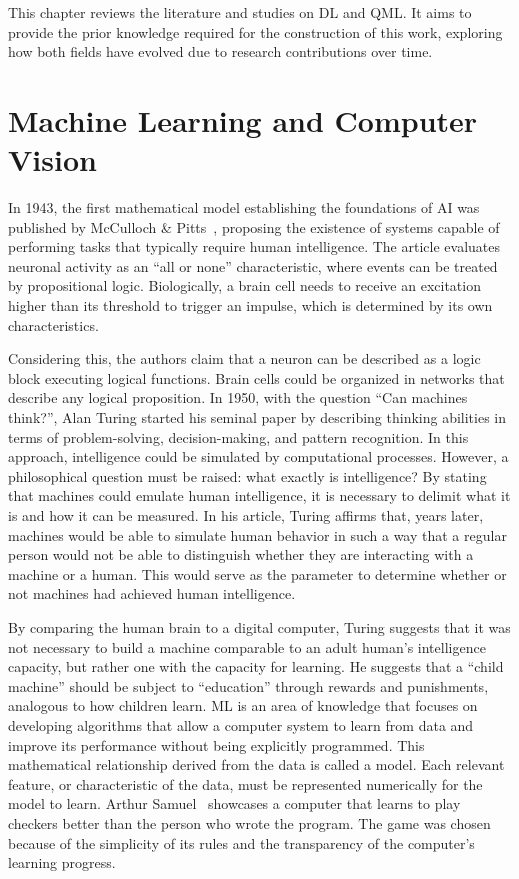 \label{chap:background}

This chapter reviews the literature and studies on \gls{DL} and \gls{QML}. It aims to provide the prior knowledge required for the construction of this work, exploring how both fields have evolved due to research contributions over time.

\section{Machine Learning and Computer Vision}
\label{sec_machine_learning}

In 1943, the first mathematical model establishing the foundations of \gls{AI} was published by McCulloch \& Pitts~\cite{mcculloch1943}, proposing the existence of systems capable of performing tasks that typically require human intelligence. The article evaluates neuronal activity as an ``all or none'' characteristic, where events can be treated by propositional logic. Biologically, a brain cell needs to receive an excitation higher than its threshold to trigger an impulse, which is determined by its own characteristics.

Considering this, the authors claim that a neuron can be described as a logic block executing logical functions. Brain cells could be organized in networks that describe any logical proposition. In 1950, with the question ``Can machines think?'', Alan Turing started his seminal paper \cite{DBLP:journals/x/Turing50} by describing thinking abilities in terms of problem-solving, decision-making, and pattern recognition. In this approach, intelligence could be simulated by computational processes. However, a philosophical question must be raised: what exactly is intelligence? By stating that machines could emulate human intelligence, it is necessary to delimit what it is and how it can be measured. In his article, Turing affirms that, years later, machines would be able to simulate human behavior in such a way that a regular person would not be able to distinguish whether they are interacting with a machine or a human. This would serve as the parameter to determine whether or not machines had achieved human intelligence.

By comparing the human brain to a digital computer, Turing suggests that it was not necessary to build a machine comparable to an adult human's intelligence capacity, but rather one with the capacity for learning. He suggests that a ``child machine'' should be subject to ``education'' through rewards and punishments, analogous to how children learn. \gls{ML} is an area of knowledge that focuses on developing algorithms that allow a computer system to learn from data and improve its performance without being explicitly programmed. This mathematical relationship derived from the data is called a model. Each relevant feature, or characteristic of the data, must be represented numerically for the model to learn. Arthur Samuel~\cite{5392560} showcases a computer that learns to play checkers better than the person who wrote the program. The game was chosen because of the simplicity of its rules and the transparency of the computer's learning progress. 

